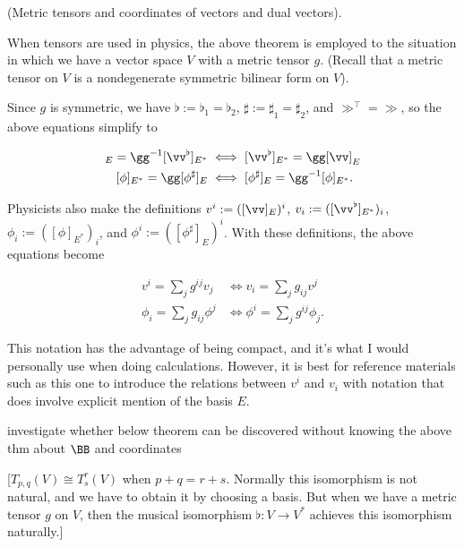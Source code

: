 \begin{remark}
    (Metric tensors and coordinates of vectors and dual vectors).
    
    When tensors are used in physics, the above theorem is employed to the situation in which we have a vector space $V$ with a metric tensor $g$. (Recall that a metric tensor on $V$ is a nondegenerate symmetric bilinear form on $V$).
    
    Since $g$ is symmetric, we have $\flat := \flat_1 = \flat_2$, $\sharp := \sharp_1 = \sharp_2$, and $\gg^\top = \gg$, so the above equations simplify to 
    
    \begin{align*}
        [\vv]_E = \gg^{-1} [\vv^{\flat}]_{E^*} &\iff [\vv^{\flat}]_{E^*} = \gg [\vv]_E \\
        [\phi]_{E^*} = \gg [\phi^{\sharp}]_E &\iff [\phi^{\sharp}]_E = \gg^{-1} [\phi]_{E^*}.
    \end{align*}
    
    Physicists also make the definitions $v^i := ([\vv]_E)^i$, $v_i := ([\vv^{\flat}]_{E^*})_i$, $\phi_i := ([\phi]_{E^*})_i$, and $\phi^i := ([\phi^{\sharp}]_E)^i$. With these definitions, the above equations become
    
    \begin{align*}
        v^i = \sum_j g^{ij} v_j &\iff v_i = \sum_j g_{ij} v^j \\
        \phi_i = \sum_j g_{ij} \phi^j &\iff \phi^i = \sum_j g^{ij} \phi_j.
    \end{align*}
    
    This notation has the advantage of being compact, and it's what I would personally use when doing calculations. However, it is best for reference materials such as this one to introduce the relations between $v^i$ and $v_i$ with notation that does involve explicit mention of the basis $E$.
\end{remark}

investigate whether below theorem can be discovered without knowing the above thm about $\BB$ and coordinates

[$T_{p,q}(V) \cong T^r_s(V)$ when $p + q = r + s$. Normally this isomorphism is not natural, and we have to obtain it by choosing a basis. But when we have a metric tensor $g$ on $V$, then the musical isomorphism $\flat:V \rightarrow V^*$ achieves this isomorphism naturally.]

